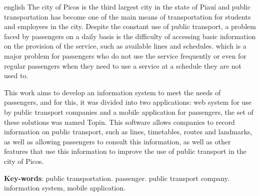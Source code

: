 \begin{resumo}[Abstract]
\begin{otherlanguage*}{english}
The city of Picos is the third largest city in the state of Piauí and public transportation has become one of the main means of transportation for students and employees in the city. Despite the constant use of public transport, a problem faced by passengers on a daily basis is the difficulty of accessing basic information on the provision of the service, such as available lines and schedules. which is a major problem for passengers who do not use the service frequently or even for regular passengers when they need to use a service at a schedule they are not used to.

This work aims to develop an information system to meet the needs of passengers, and for this, it was divided into two applications: web system for use by public transport companies and a mobile application for passengers, the set of these solutions was named Topin. This software allows companies to record information on public transport, such as lines, timetables, routes and landmarks, as well as allowing passengers to consult this information, as well as other features that use this information to improve the use of public transport in the city of Picos.

\vspace{\onelineskip}
\noindent
\textbf{Key-words}: public transportation. passenger. public transport company. information system, mobile application.
\end{otherlanguage*}
\end{resumo}